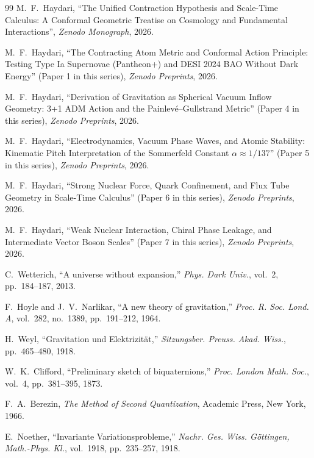 \documentclass[11pt,a4paper]{article}
\begin{document}
\begin{thebibliography}{99}
    M.~F.~Haydari, ``The Unified Contraction Hypothesis and Scale-Time Calculus: A Conformal Geometric Treatise on Cosmology and Fundamental Interactions'', \textit{Zenodo Monograph}, 2026.

    M.~F.~Haydari, ``The Contracting Atom Metric and Conformal Action Principle: Testing Type Ia Supernovae (Pantheon+) and DESI 2024 BAO Without Dark Energy'' (Paper 1 in this series), \textit{Zenodo Preprints}, 2026.

    M.~F.~Haydari, ``Derivation of Gravitation as Spherical Vacuum Inflow Geometry: 3+1 ADM Action and the Painlevé--Gullstrand Metric'' (Paper 4 in this series), \textit{Zenodo Preprints}, 2026.

    M.~F.~Haydari, ``Electrodynamics, Vacuum Phase Waves, and Atomic Stability: Kinematic Pitch Interpretation of the Sommerfeld Constant $\alpha \approx 1/137$'' (Paper 5 in this series), \textit{Zenodo Preprints}, 2026.

    M.~F.~Haydari, ``Strong Nuclear Force, Quark Confinement, and Flux Tube Geometry in Scale-Time Calculus'' (Paper 6 in this series), \textit{Zenodo Preprints}, 2026.

    M.~F.~Haydari, ``Weak Nuclear Interaction, Chiral Phase Leakage, and Intermediate Vector Boson Scales'' (Paper 7 in this series), \textit{Zenodo Preprints}, 2026.

    C.~Wetterich, ``A universe without expansion,'' \textit{Phys. Dark Univ.}, vol.~2, pp.~184--187, 2013.

    F.~Hoyle and J.~V.~Narlikar, ``A new theory of gravitation,'' \textit{Proc. R. Soc. Lond. A}, vol.~282, no.~1389, pp.~191--212, 1964.

    H.~Weyl, ``Gravitation und Elektrizit\"at,'' \textit{Sitzungsber. Preuss. Akad. Wiss.}, pp.~465--480, 1918.

    W.~K.~Clifford, ``Preliminary sketch of biquaternions,'' \textit{Proc. London Math. Soc.}, vol.~4, pp.~381--395, 1873.

    F.~A.~Berezin, \textit{The Method of Second Quantization}, Academic Press, New York, 1966.

    E.~Noether, ``Invariante Variationsprobleme,'' \textit{Nachr. Ges. Wiss. G\"ottingen, Math.-Phys. Kl.}, vol.~1918, pp.~235--257, 1918.
\end{thebibliography}
\end{document}
